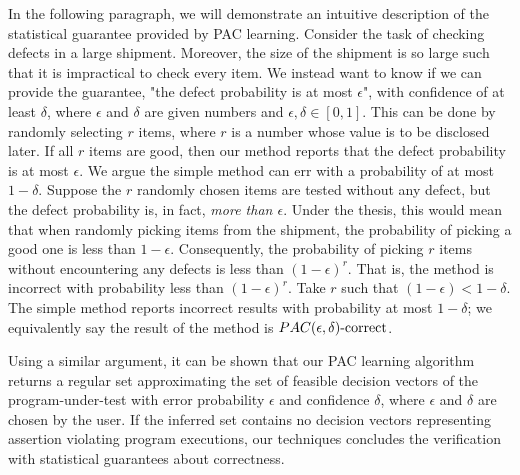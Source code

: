 In the following paragraph, we will demonstrate an intuitive description of the statistical guarantee provided by PAC learning. Consider the task of checking defects in a large shipment. Moreover, the size of the shipment is so large such that it is impractical to check every item. We instead want to know if we can provide the guarantee, "the defect probability is at most $\epsilon$", with confidence of at least $\delta$, where $\epsilon$ and $\delta$ are given numbers and $\epsilon, \delta \in [0,1]$. This can be done by randomly selecting $r$ items, where $r$ is a number whose value is to be disclosed later. If all $r$ items are good, then our method reports that the defect probability is at most $\epsilon$. We argue the simple method can err with a probability of at most $1-\delta$. Suppose the $r$ randomly chosen items are tested without any defect, but the defect probability is, in fact, \emph{more than $\epsilon$}. Under the thesis, this would mean that when randomly picking items from the shipment, the probability of picking a good one is less than $1-\epsilon$. Consequently, the probability of picking $r$ items without encountering any defects is less than $(1-\epsilon)^r$. That is, the method is incorrect with probability less than $(1-\epsilon)^r$. Take $r$ such that $(1-\epsilon) < 1-\delta$. The simple method reports incorrect results with probability at most $1-\delta$; we equivalently say the result of the method is \emph{$PAC(\epsilon, \delta)\text{-correct}$}.

Using a similar argument, it can be shown that our PAC learning algorithm returns a regular set approximating the set of feasible decision vectors of the program-under-test with error probability $\epsilon$ and confidence $\delta$, where $\epsilon$ and $\delta$ are chosen by the user. If the inferred set contains no decision vectors representing assertion violating program executions, our techniques concludes the verification with statistical guarantees about correctness. 

